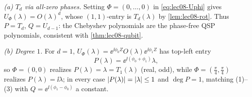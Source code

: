 \begin{example}
\label{exa:lec08-qsp}
\emph{(a) $T_d$ via all-zero phases.} Setting $\Phi=(0,\dots,0)$ in
\eqref{eq:lec08-Uphi} gives $U_\Phi(\lambda)=O(\lambda)^d$, whose $(1,1)$-entry is
$T_d(\lambda)$ by \cref{lem:lec08-rot}. Thus $P=T_d$, $Q=U_{d-1}$: the Chebyshev
polynomials are the phase-free QSP polynomials, consistent with
\cref{thm:lec08-qubit}.

\emph{(b) Degree $1$.} For $d=1$,
$U_\Phi(\lambda)=\ee^{\ii\phi_0 Z}O(\lambda)\ee^{\ii\phi_1 Z}$ has top-left entry
\[
  P(\lambda)=\ee^{\ii(\phi_0+\phi_1)}\lambda,
\]
so $\Phi=(0,0)$ realizes $P(\lambda)=\lambda=T_1(\lambda)$ (real, odd), while
$\Phi=(\tfrac\pi4,\tfrac\pi4)$ realizes $P(\lambda)=\ii\lambda$; in every case
$\left\lvert P(\lambda) \right\rvert=\left\lvert \lambda \right\rvert\le1$ and $\deg P=1$, matching (1)--(3) with
$Q=\ee^{\ii(\phi_1-\phi_0)}$ a constant.


\end{example}
